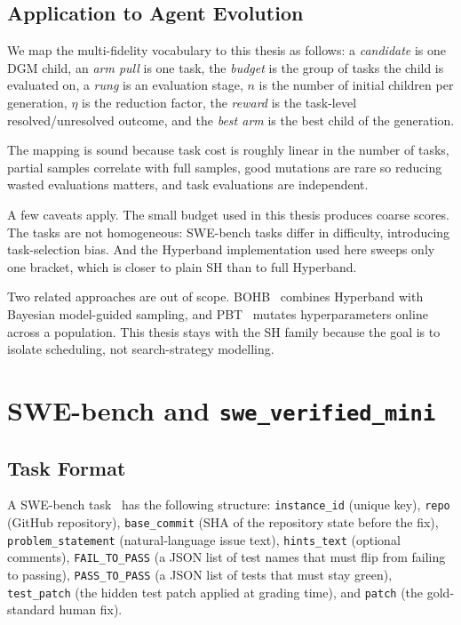 \subsection{Application to Agent Evolution}

We map the multi-fidelity vocabulary to this thesis as follows: a
\emph{candidate} is one DGM child, an \emph{arm pull} is one task, the
\emph{budget} is the group of tasks the child is evaluated on, a
\emph{rung} is an evaluation stage, $n$ is the number of initial
children per generation, $\eta$ is the reduction factor, the
\emph{reward} is the task-level resolved/unresolved outcome, and the
\emph{best arm} is the best child of the generation.

The mapping is sound because task cost is roughly linear in the number
of tasks, partial samples correlate with full samples, good mutations
are rare so reducing wasted evaluations matters, and task evaluations
are independent.

A few caveats apply. The small budget used in this thesis produces
coarse scores. The tasks are not homogeneous: SWE-bench tasks differ
in difficulty, introducing task-selection bias. And the Hyperband
implementation used here sweeps only one bracket, which is closer to
plain SH than to full Hyperband.

Two related approaches are out of scope.
BOHB~\cite{Falkner:18} combines Hyperband with Bayesian
model-guided sampling, and PBT~\cite{Jaderberg:17} mutates
hyperparameters online across a population. This thesis stays with
the SH family because the goal is to isolate scheduling, not
search-strategy modelling.

\section{SWE-bench and \texttt{swe\_verified\_mini}}
\label{sec:swebench}

\subsection{Task Format}

A SWE-bench task~\cite{Jimenez:24} has the following structure:
\texttt{instance\_id} (unique key), \texttt{repo} (GitHub repository),
\texttt{base\_commit} (SHA of the repository state before the fix),
\texttt{problem\_statement} (natural-language issue text),
\texttt{hints\_text} (optional comments), \texttt{FAIL\_TO\_PASS} (a
JSON list of test names that must flip from failing to passing),
\texttt{PASS\_TO\_PASS} (a JSON list of tests that must stay green),
\texttt{test\_patch} (the hidden test patch applied at grading time),
and \texttt{patch} (the gold-standard human fix).

